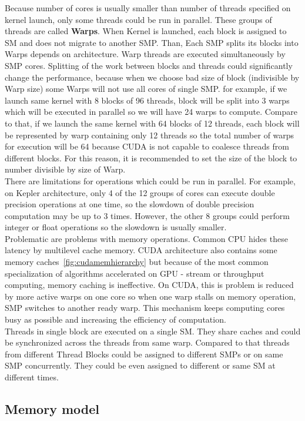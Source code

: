 Because number of cores is usually smaller than number of threads specified on kernel launch, only some threads could be run in parallel. These groups of threads are called \textbf{Warps}. When Kernel is launched, each block is assigned to SM and does not migrate to another SMP. Than, Each SMP splits its blocks into Warps depends on architecture. Warp threads are executed simultaneously by SMP cores. Splitting of the work between blocks and threads could significantly change the performance, because when we choose bad size of block (indivisible by Warp size) some Warps will not use all cores of single SMP. for example, if we launch same kernel with 8 blocks of 96 threads, block will be split into 3 warps which will be executed in parallel so we will have 24 warps to compute. Compare to that, if we launch the same kernel with 64 blocks of 12 threads, each block will be represented by warp containing only 12 threads so the total number of warps for execution will be 64 because CUDA is not capable to coalesce threads from different blocks. For this reason, it is recommended to set the size of the block to number divisible by size of Warp.\\
There are limitations for operations which could be run in parallel. For example, on Kepler architecture, only 4 of the 12 groups of cores can execute double precision operations at one time, so the slowdown of double precision computation may be up to 3 times. However, the other 8 groups could perform integer or float operations so the slowdown is usually smaller.\\
Problematic are problems with memory operations. Common CPU hides these latency by multilevel cache memory. CUDA architecture also contains some memory caches~\ref{fig:cudamemhierarchy} but because of the most common specialization of algorithms accelerated on GPU - stream or throughput computing, memory caching is ineffective. On CUDA, this is problem is reduced by more active warps on one core so when one warp stalls on memory operation, SMP switches to another ready warp. This mechanism keeps computing cores busy as possible and increasing the efficiency of computation.\\
Threads in single block are executed on a single SM. They share caches and could be synchronized across the threads from same warp. Compared to that threads from different Thread Blocks could be assigned to different SMPs or on same SMP concurrently. They could be even assigned to different or same SM at different times.

\subsection{Memory model}

